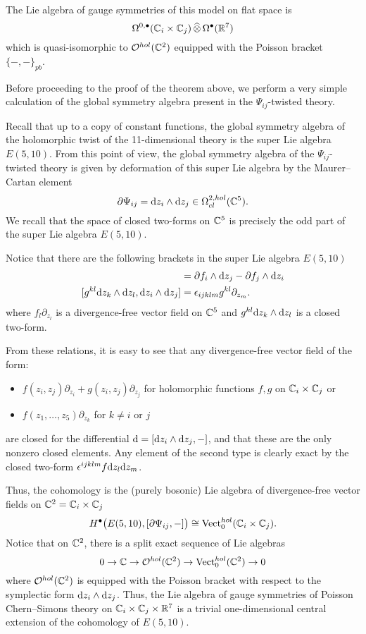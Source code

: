 \documentclass[11pt]{amsart}
\begin{document}
The Lie algebra of gauge symmetries of this model on flat space is 
\[
\Omega^{0,\bullet} (\mathbb C_i \times \mathbb C_j) \, \widehat{\otimes} \, \Omega^\bullet(\mathbb R^7) 
\]
which is quasi-isomorphic to $\mathcal O^{hol}(\mathbb C^2)$ equipped with the Poisson bracket $\{-,-\}_{pb}$. 

Before proceeding to the proof of the theorem above, we perform a very simple calculation of the global symmetry algebra present in the $\Psi_{ij}$-twisted theory. 

Recall that up to a copy of constant functions, the global symmetry algebra of the holomorphic twist of the 11-dimensional theory is the super Lie algebra $E(5,10)$.
From this point of view, the global symmetry algebra of the $\Psi_{ij}$-twisted theory is given by deformation of this super Lie algebra by the Maurer--Cartan element 
\[
\partial \Psi_{ij} = {\rm d} z_i \wedge {\rm d} z_j \in \Omega^{2,hol}_{cl}(\mathbb C^5) .
\]
We recall that the space of closed two-forms on $\mathbb C^5$ is precisely the odd part of the super Lie algebra $E(5,10)$. 

Notice that there are the following brackets in the super Lie algebra $E(5,10)$ 
\begin{align*}
[f_l \partial_{z_l} , \d z_i \wedge \d z_j] & = \del f_i \wedge \d z_j - \del f_j \wedge \d z_i \\
[g^{kl} \d z_k \wedge \d z_l , \d z_i \wedge \d z_j ] & = \ep_{ijklm} g^{kl} \partial_{z_m} .
\end{align*}
where $f_l \partial_{z_l}$ is a divergence-free vector field on $\mathbb C^5$ and $g^{kl} {\rm d} z_k \wedge {\rm d} z_l$ is a closed two-form. 

From these relations, it is easy to see that any divergence-free vector field of the form:
\begin{itemize}
\item $f(z_i, z_j) \partial_{z_i} + g(z_i, z_j) \partial_{z_j}$ for holomorphic functions $f,g$ on $\mathbb C_i \times \mathbb C_j$ or 
\item $f(z_1,\ldots,z_5) \partial_{z_k}$ for $k \ne i$ or $j$
\end{itemize}
are closed for the differential ${\rm d} = [{\rm d} z_i \wedge {\rm d} z_j  , -]$, and that these are the only nonzero closed elements. 
Any element of the second type is clearly exact by the closed two-form $\epsilon^{ijklm} f {\rm d} z_l {\rm d} z_m$. 

Thus, the cohomology is the (purely bosonic) Lie algebra of divergence-free vector fields on $\mathbb C^2 = \mathbb C_i \times \mathbb C_j$
\[
H^\bullet\big(E(5,10), [\partial \Psi_{ij}, -] \big) \cong {\rm Vect}^{hol}_0(\mathbb C_i \times \mathbb C_j) .
\]
Notice that on $\mathbb C^2$, there is a split exact sequence of Lie algebras
\[
0 \to \mathbb C \to \mathcal O^{hol}(\mathbb C^2) \to {\rm Vect}_0^{hol} (\mathbb C^2) \to 0
\]
where $\mathcal O^{hol}(\mathbb C^2)$ is equipped with the Poisson bracket with respect to the symplectic form ${\rm d} z_i \wedge {\rm d} z_j$.
Thus, the Lie algebra of gauge symmetries of Poisson Chern--Simons theory on $\mathbb C_i \times \mathbb C_j \times \mathbb R^7$ is a trivial one-dimensional central extension of the cohomology of $E(5,10)$. 
\end{document}
